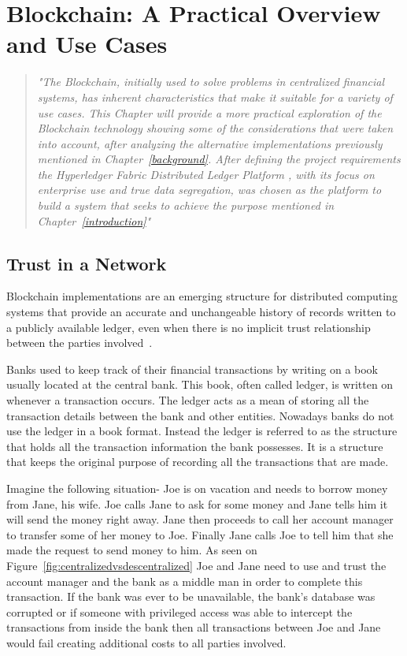 \chapter{Blockchain: A Practical Overview and Use Cases}

\begin{quote} \emph{"The Blockchain, initially used to solve problems in
  centralized financial systems, has inherent characteristics that make it
  suitable for a variety of use cases. This Chapter will provide a more
  practical exploration of the Blockchain technology showing some of the
  considerations that were taken into account, after analyzing the alternative
  implementations previously mentioned in Chapter~\ref{background}. After
  defining the project requirements the Hyperledger Fabric Distributed Ledger
  Platform , with its focus on enterprise use and true data segregation, was
  chosen as the platform to build a system that seeks to achieve the purpose
  mentioned in Chapter~\ref{introduction}"}
\end{quote}

\section{Trust in a Network}

Blockchain implementations are an emerging structure for distributed computing
systems that provide an accurate and unchangeable history of records written to
a publicly available ledger, even when there is no implicit trust relationship
between the parties involved~\cite{Barclay2017}.

Banks used to keep track of their financial transactions by writing on a book
usually located at the central bank. This book, often called ledger, is written
on whenever a transaction occurs. The ledger acts as a mean of storing all the
transaction details between the bank and other entities. Nowadays banks do not
use the ledger in a book format. Instead the ledger is referred to as the
structure that holds all the transaction information the bank possesses. It is
a structure that keeps the original purpose of recording all the transactions
that are made.

Imagine the following situation- Joe is on vacation and needs to borrow money
from Jane, his wife. Joe calls Jane to ask for some money and Jane tells him it
will send the money right away. Jane then proceeds to call her account manager
to transfer some of her money to Joe. Finally Jane calls Joe to tell him that
she made the request to send money to him.  As seen on
Figure~\ref{fig:centralizedvsdescentralized} Joe and Jane need to use and trust
the account manager and the bank as a middle man in order to complete this
transaction. If the bank was ever to be unavailable, the bank's database was
corrupted or if someone with  privileged access was able to intercept the
transactions from inside the bank then all transactions between Joe and Jane
would fail creating additional costs to all parties involved. 

